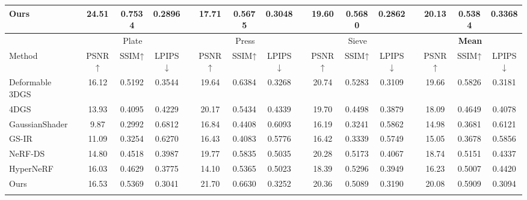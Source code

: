 \begin{table}[t]
{\begin{tabular}{lccccccccccccccc}
    Ours &\colorbox{red!25}{24.51} &\colorbox{red!25}{0.7534}  &\colorbox{red!25}{0.2896}  & &\colorbox{yellow!25}{17.71 }&\colorbox{red!25}{0.5675} & \colorbox{red!25}{0.3048}&  &\colorbox{red!25}{19.60} &\colorbox{red!25}{0.5680} &\colorbox{red!25}{0.2862}  & &\colorbox{red!25}{20.13} &\colorbox{orange!25}{0.5384} & \colorbox{orange!25}{0.3368}    \\ 
    \midrule
     & \multicolumn{3}{c}{Plate} & &\multicolumn{3}{c}{Press}& &\multicolumn{3}{c}{Sieve}& &\multicolumn{3}{c}{\textbf{Mean}} \\ \cmidrule{2-4} \cmidrule{6-8} \cmidrule{10-12} \cmidrule{14-16}
    Method & PSNR↑ & SSIM↑& LPIPS↓& &PSNR↑ & SSIM↑& LPIPS↓& &PSNR↑ & SSIM↑& LPIPS↓& &PSNR↑ & SSIM↑& LPIPS↓  \\ 
    \midrule
    Deformable 3DGS~\citep{yang2023deformable} &\colorbox{orange!25}{16.12}  &\colorbox{orange!25}{0.5192}  &\colorbox{orange!25}{0.3544} & &19.64 &\colorbox{orange!25}{0.6384} &\colorbox{orange!25}{0.3268} & &\colorbox{red!25}{20.74}  &\colorbox{orange!25}{0.5283} &\colorbox{red!25}{0.3109 }&   &\colorbox{orange!25}{19.66} &\colorbox{orange!25}{0.5826} &\colorbox{orange!25}{0.3181}   \\ 
    4DGS~\citep{wu20234d} &13.93  &0.4095  &0.4229 & &\colorbox{orange!25}{20.17} &0.5434  &\colorbox{yellow!25}{0.4339} & &19.70  &0.4498 &\colorbox{yellow!25}{0.3879} & &18.09  &0.4649 &\colorbox{yellow!25}{0.4078}   \\
    GaussianShader~\citep{jiang2023gaussianshader} &9.87  &0.2992  &0.6812 & &16.84 &0.4408  &0.6093 & &16.19  &0.3241 &0.5862 & &14.98  &0.3681 & 0.6121  \\
    GS-IR~\citep{liang2023gs} &11.09  &0.3254  &0.6270 & &16.43 &0.4083  &0.5776 & &16.42  &0.3339 &0.5749 & &15.05  &0.3678 &0.5856   \\
    NeRF-DS~\citep{yan2023nerf} &14.80 &0.4518  &0.3987 & &\colorbox{yellow!25}{19.77 }&\colorbox{yellow!25}{0.5835}  &0.5035 & &\colorbox{yellow!25}{20.28}  &\colorbox{yellow!25}{0.5173 }&0.4067 & &\colorbox{yellow!25}{18.74}  &\colorbox{yellow!25}{0.5151} &0.4337   \\
    HyperNeRF~\citep{park2021hypernerf}&\colorbox{yellow!25}{16.03 } &\colorbox{yellow!25}{0.4629}  &\colorbox{yellow!25}{0.3775} & &14.10 &0.5365  &0.5023 & &18.39  &\colorbox{red!25}{0.5296} &0.3949 & &16.23  &0.5007 &0.4420   \\
    Ours &\colorbox{red!25}{16.53}  &\colorbox{red!25}{0.5369}  &\colorbox{red!25}{0.3041} & &\colorbox{red!25}{21.70} &\colorbox{red!25}{0.6630}  &\colorbox{red!25}{0.3252} & &\colorbox{orange!25}{20.36}  &0.5089 &\colorbox{orange!25}{0.3190} & &\colorbox{red!25}{20.08}  &\colorbox{red!25}{0.5909} &\colorbox{red!25}{0.3094}   \\ 
    \bottomrule
    \label{table1}
    \end{tabular}
    }
\end{table}